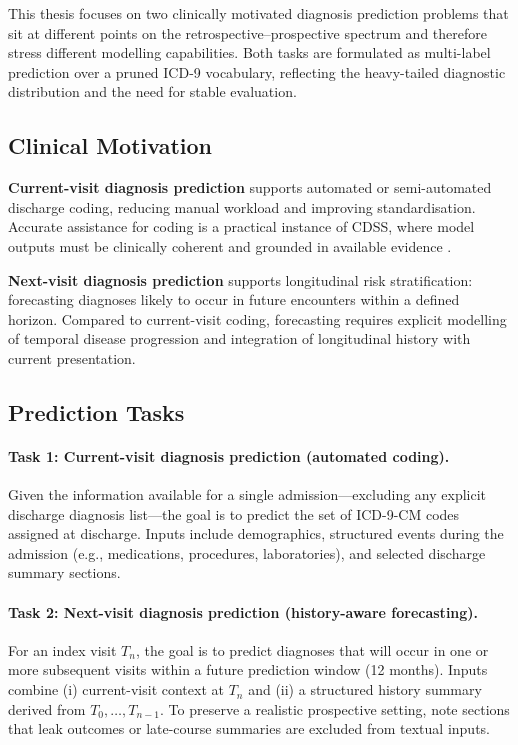 This thesis focuses on two clinically motivated diagnosis prediction problems that sit at different points on the retrospective--prospective spectrum and therefore stress different modelling capabilities. Both tasks are formulated as multi-label prediction over a pruned ICD-9 vocabulary, reflecting the heavy-tailed diagnostic distribution and the need for stable evaluation.

\subsection{Clinical Motivation}
\label{subsec:background-motivation}

\textbf{Current-visit diagnosis prediction} supports automated or semi-automated discharge coding, reducing manual workload and improving standardisation. Accurate assistance for coding is a practical instance of CDSS, where model outputs must be clinically coherent and grounded in available evidence \cite{sutton2020cdss}.

\textbf{Next-visit diagnosis prediction} supports longitudinal risk stratification: forecasting diagnoses likely to occur in future encounters within a defined horizon. Compared to current-visit coding, forecasting requires explicit modelling of temporal disease progression and integration of longitudinal history with current presentation.

\subsection{Prediction Tasks}
\label{subsec:background-tasks}

\paragraph{Task 1: Current-visit diagnosis prediction (automated coding).}
Given the information available for a single admission---excluding any explicit discharge diagnosis list---the goal is to predict the set of ICD-9-CM codes assigned at discharge. Inputs include demographics, structured events during the admission (e.g., medications, procedures, laboratories), and selected discharge summary sections.

\paragraph{Task 2: Next-visit diagnosis prediction (history-aware forecasting).}
For an index visit $T_n$, the goal is to predict diagnoses that will occur in one or more subsequent visits within a future prediction window (12 months). Inputs combine (i) current-visit context at $T_n$ and (ii) a structured history summary derived from $T_0,\dots,T_{n-1}$. To preserve a realistic prospective setting, note sections that leak outcomes or late-course summaries are excluded from textual inputs.

